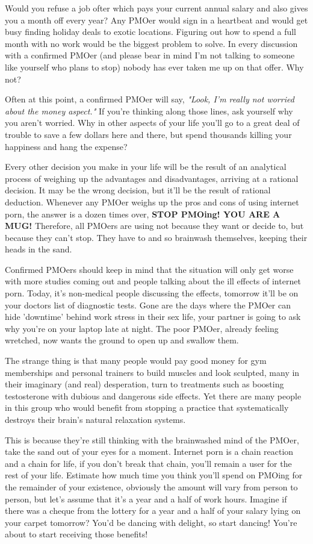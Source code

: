 \documentclass[easypeasy.tex]{subfiles}
\begin{document}
Would you refuse a job ofter which pays your current annual salary and also gives you a month off every year? Any PMOer would sign in a heartbeat and would get busy finding holiday deals to exotic locations. Figuring out how to spend a full month with no work would be the biggest problem to solve. In every discussion with a confirmed PMOer (and please bear in mind I'm not talking to someone like yourself who plans to stop) nobody has ever taken me up on that offer. Why not?

Often at this point, a confirmed PMOer will say, \textit{"Look, I'm really not worried about the money aspect."} If you're thinking along those lines, ask yourself why you aren't worried. Why in other aspects of your life you'll go to a great deal of trouble to save a few dollars here and there, but spend thousands killing your happiness and hang the expense?

Every other decision you make in your life will be the result of an analytical process of weighing up the advantages and disadvantages, arriving at a rational decision. It may be the wrong decision, but it'll be the result of rational deduction. Whenever any PMOer weighs up the pros and cons of using internet porn, the answer is a dozen times over, \textbf{STOP PMOing! YOU ARE A MUG!} Therefore, all PMOers are using not because they want or decide to, but because they can't stop. They have to and so brainwash themselves, keeping their heads in the sand.

Confirmed PMOers should keep in mind that the situation will only get worse with more studies coming out and people talking about the ill effects of internet porn. Today, it's non-medical people discussing the effects, tomorrow it'll be on your doctors list of diagnostic tests. Gone are the days where the PMOer can hide 'downtime' behind work stress in their sex life, your partner is going to ask why you're on your laptop late at night. The poor PMOer, already feeling wretched, now wants the ground to open up and swallow them.

The strange thing is that many people would pay good money for gym memberships and personal trainers to build muscles and look sculpted, many in their imaginary (and real) desperation, turn to treatments such as boosting testosterone with dubious and dangerous side effects. Yet there are many people in this group who would benefit from stopping a practice that systematically destroys their brain's natural relaxation systems.

This is because they're still thinking with the brainwashed mind of the PMOer, take the sand out of your eyes for a moment. Internet porn is a chain reaction and a chain for life, if you don't break that chain, you'll remain a user for the rest of your life. Estimate how much time you think you'll spend on PMOing for the remainder of your existence, obviously the amount will vary from person to person, but let's assume that it's a year and a half of work hours. Imagine if there was a cheque from the lottery for a year and a half of your salary lying on your carpet tomorrow? You'd be dancing with delight, so start dancing! You're about to start receiving those benefits!
\end{document}
